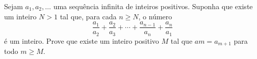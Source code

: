 Sejam $a_1, a_2, \dots$ uma sequência infinita de inteiros positivos.
Suponha que existe um inteiro $N > 1$ tal que, para cada $n \ge N$, o número
\[ \frac{a_1}{a_2} + \frac{a_2}{a_3} + \cdots + \frac{a_{n-1}}{a_n} + \frac{a_n}{a_1} \]
é um inteiro.
Prove que existe um inteiro positivo $M$ tal que $am = a_{m+1}$ para todo $m \ge M$.
